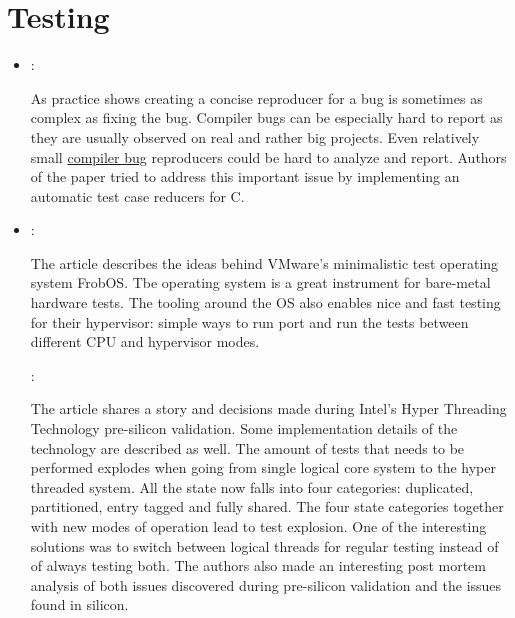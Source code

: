 \section*{Testing}
\begin{itemize}
    \item \cite{Regehr:C-Reduce:2012}:

    As practice shows creating a concise reproducer for a bug is sometimes as complex as fixing the bug. Compiler bugs can be especially hard to report as they are usually observed on real and rather big projects. Even relatively small \href{https://yulyugin.github.io/blog/2022/icc-bug}{compiler bug} reproducers could be hard to analyze and report. Authors of the paper tried to address this important issue by implementing an automatic test case reducers for C.

    \item \cite{Easson:FrobOS:2012}:

    The article describes the ideas behind VMware's minimalistic test operating system FrobOS. Tbe operating system is a great instrument for bare-metal hardware tests. The tooling around the OS also enables nice and fast testing for their hypervisor: simple ways to run port and run the tests between different CPU and hypervisor modes.

    \cite{Burns:IntelHTTValidation:2002}:

    The article shares a story and decisions made during Intel's Hyper Threading Technology pre-silicon validation. Some implementation details of the technology are described as well. The amount of tests that needs to be performed explodes when going from single logical core system to the hyper threaded system. All the state now falls into four categories: duplicated, partitioned, entry tagged and fully shared. The four state categories together with new modes of operation lead to test explosion. One of the interesting solutions was to switch between logical threads for regular testing instead of of always testing both. The authors also made an interesting post mortem analysis of both issues discovered during pre-silicon validation and the issues found in silicon.
\end{itemize}

